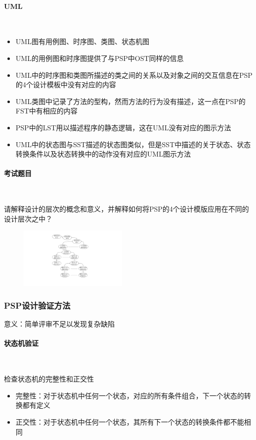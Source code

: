 \paragraph{UML}~{} \par
\begin{itemize}
    \item UML图有用例图、时序图、类图、状态机图
    \item UML的用例图和时序图提供了与PSP中OST同样的信息
    \item UML中的时序图和类图所描述的类之间的关系以及对象之间的交互信息在PSP的4个设计模板中没有对应的内容
    \item UML类图中记录了方法的型构，然而方法的行为没有描述，这一点在PSP的FST中有相应的内容
    \item PSP中的LST用以描述程序的静态逻辑，这在UML没有对应的图示方法
    \item UML中的状态图与SST描述的状态图类似，但是SST中描述的关于状态、状态转换条件以及状态转换中的动作没有对应的UML图示方法
\end{itemize}

\paragraph{考试题目}~{} \par
\begin{problem}
请解释设计的层次的概念和意义，并解释如何将PSP的4个设计模版应用在不同的设计层次之中？
\begin{figure}[H]
    \vspace{-0.5em}
	\centering
	\includegraphics[width=0.47\textwidth]{images/设计的层次.pdf}
    \vspace{-1em}
\end{figure}
\end{problem}

\subsubsection{PSP设计验证方法}
意义：简单评审不足以发现复杂缺陷

\paragraph{状态机验证}~{} \par
检查状态机的完整性和正交性
\begin{itemize}
    \item 完整性：对于状态机中任何一个状态，对应的所有条件组合，下一个状态的转换都有定义
    \item 正交性：对于状态机中任何一个状态，其所有下一个状态的转换条件都不能相同
\end{itemize}

